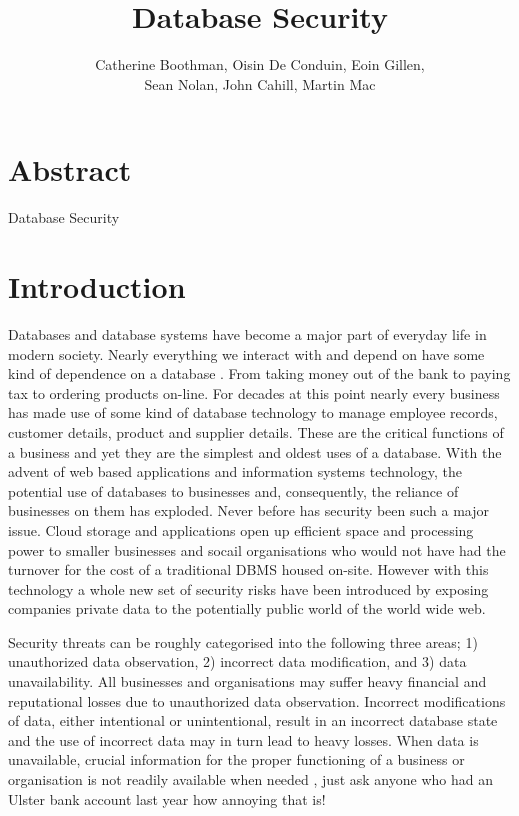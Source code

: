 \documentclass[11pt]{article}
\title{Database Security}
\author{Catherine Boothman, Oisin De Conduin, Eoin Gillen, \\
Sean Nolan, John Cahill, Martin Mac}
\begin{document}
\maketitle

\section{Abstract}
Database Security

\section{Introduction}
Databases and database systems have become a major part of everyday life in modern society.  Nearly everything we interact with and depend on have some kind of dependence on a database \cite{ElmNav}.  From taking money out of the bank to paying tax to ordering products on-line.  For decades at this point nearly every business has made use of some kind of database technology to manage employee records, customer details, product and supplier details.  These are the critical functions of a business and yet they are the simplest and oldest uses of a database.  With the advent of web based applications and information systems technology, the potential use of databases to businesses and, consequently, the reliance of businesses on them has exploded.  Never before has security been such a major issue.  Cloud storage and applications open up efficient space and processing power to smaller businesses and socail organisations who would not have had the turnover for the cost of a traditional DBMS housed on-site.  However with this technology a whole new set of security risks have been introduced by exposing companies private data to the potentially public world of the world wide web.  

Security threats can be roughly categorised into the following three areas; 1) unauthorized data observation, 2) incorrect data modification, and 3) data unavailability.  All businesses and organisations may suffer heavy financial and reputational losses due to unauthorized data observation. Incorrect modifications of data, either intentional or unintentional, result in an incorrect database state and the use of incorrect data may in turn lead to heavy losses.  When data is unavailable, crucial information for the proper functioning of a business or organisation is not readily available when needed \cite{BerSand}, just ask anyone who had an Ulster bank account last year how annoying that is!  
\end{document}
